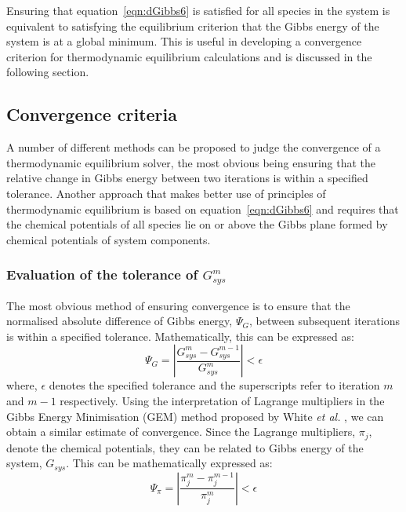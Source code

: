 		Ensuring that equation~\ref{eqn:dGibbs6} is satisfied for all species in the system is equivalent to satisfying the equilibrium criterion that the Gibbs energy of the system is at a global minimum. This is useful in developing a convergence criterion for thermodynamic equilibrium calculations and is discussed in the following section.
		
	\subsection{Convergence criteria}
	A number of different methods can be proposed to judge the convergence of a thermodynamic equilibrium solver, the most obvious being ensuring that the relative change in Gibbs energy between two iterations is within a specified tolerance. Another approach that makes better use of principles of thermodynamic equilibrium is based on equation~\ref{eqn:dGibbs6} and requires that the chemical potentials of all species lie on or above the Gibbs plane formed by chemical potentials of system components.  
		\subsubsection{Evaluation of the tolerance of $G_{sys}^m$}
		The most obvious method of ensuring convergence is to ensure that the normalised absolute difference of Gibbs energy, $\Psi_G$, between subsequent iterations is within a specified tolerance. Mathematically, this can be expressed as:
		\begin{equation}\label{eqn:conv1}
			\Psi_G = \left \vert \frac{G_{sys}^{m} - G_{sys}^{m-1}}{G_{sys}^{m}} \right \vert < \epsilon
		\end{equation}
		where, $\epsilon$ denotes the specified tolerance and the superscripts refer to iteration $m$ and $m-1$ respectively. Using the interpretation of Lagrange multipliers in the Gibbs Energy Minimisation (GEM) method proposed by White \textit{et al.} \cite{White58a}, we can obtain a similar estimate of convergence. Since the Lagrange multipliers, $\pi_{j}$, denote the chemical potentials, they can be related to Gibbs energy of the system, $G_{sys}$. This can be mathematically expressed as:
		\begin{equation}\label{eqn:conv2}
			\Psi_{\pi} = \left \vert \frac{\pi_{j}^{m} - \pi_{j}^{m-1}}{\pi_{j}^{m}} \right \vert < \epsilon
		\end{equation}
		
